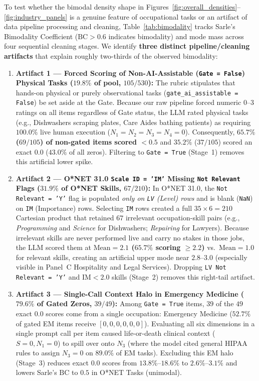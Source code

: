 \documentclass[9pt,letterpaper]{extarticle}
\begin{document}
To test whether the bimodal density shape in Figures~\ref{fig:overall_densities}--\ref{fig:industry_panels} is a genuine feature of occupational tasks or an artifact of data pipeline processing and cleaning, Table~\ref{tab:bimodality} tracks Sarle's Bimodality Coefficient ($\text{BC} > 0.6$ indicates bimodality) and mode mass across four sequential cleaning stages. We identify \textbf{three distinct pipeline/cleaning artifacts} that explain roughly two-thirds of the observed bimodality:
\begin{enumerate}[leftmargin=1.4em,itemsep=0.8pt,topsep=1pt,parsep=0pt]
    \item \textbf{Artifact 1 --- Forced Scoring of Non-AI-Assistable (\texttt{Gate = False}) Physical Tasks ($19.8\%$ of pool, $105/530$):} The rubric stipulates that hands-on physical or purely observational tasks (\texttt{gate\_ai\_assistable = False}) be set aside at the Gate. Because our raw pipeline forced numeric $0$--$3$ ratings on all items regardless of Gate status, the LLM rated physical tasks (e.g., Dishwashers scraping plates, Care Aides bathing patients) as requiring $100.0\%$ live human execution ($N_1=N_2=N_3=N_4=0$). Consequently, \textbf{$65.7\%$ ($69/105$) of non-gated items scored $<0.5$} and $35.2\%$ ($37/105$) scored an exact $0.0$ ($43.0\%$ of all zeros). Filtering to \texttt{Gate = True} (Stage~1) removes this artificial lower spike.
    \item \textbf{Artifact 2 --- O*NET 31.0 \texttt{Scale ID = 'IM'} Missing \texttt{Not Relevant} Flags ($31.9\%$ of O*NET Skills, $67/210$):} In O*NET 31.0, the \texttt{Not Relevant = 'Y'} flag is populated \emph{only on \texttt{LV} (Level) rows} and is blank (\texttt{NaN}) on \texttt{IM} (Importance) rows. Selecting \texttt{IM} rows created a full $35\times 6=210$ Cartesian product that retained $67$ irrelevant occupation-skill pairs (e.g., \emph{Programming} and \emph{Science} for Dishwashers; \emph{Repairing} for Lawyers). Because irrelevant skills are never performed live and carry no stakes in those jobs, the LLM scored them at \textbf{$\text{Mean}=2.1$ ($65.7\%$ scoring $\ge 2.2$)} vs.\ \textbf{$\text{Mean}=1.0$} for relevant skills, creating an artificial upper mode near $2.8\text{--}3.0$ (especially visible in Panel~C Hospitality and Legal Services). Dropping \texttt{LV Not Relevant = 'Y'} and $\text{IM}<2.0$ skills (Stage~2) removes this right-tail artifact.
    \item \textbf{Artifact 3 --- Single-Call Context Halo in Emergency Medicine ($79.6\%$ of Gated Zeros, $39/49$):} Among \texttt{Gate = True} items, $39$ of the $49$ exact $0.0$ scores come from a single occupation: Emergency Medicine ($52.7\%$ of gated EM items receive $[0,0,0,0,0,0]$). Evaluating all six dimensions in a single prompt call per item caused life-or-death clinical context ($S=0, N_1=0$) to spill over onto $N_3$ (where the model cited general HIPAA rules to assign $N_3=0$ on $89.0\%$ of EM tasks). Excluding this EM halo (Stage~3) reduces exact $0.0$ scores from $13.8\%\text{--}18.6\%$ to \textbf{$2.6\%\text{--}3.1\%$} and lowers Sarle's $\text{BC}$ to $0.5$ in O*NET Tasks (unimodal).

\end{enumerate}
\end{document}
